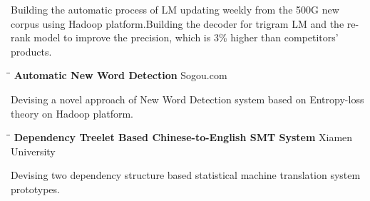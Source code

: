 \documentclass{res}
\begin{document}
\begin{resume}
   Building the automatic process of LM updating weekly from the 500G new corpus using Hadoop platform.Building the decoder for trigram LM and the re-rank model to improve the precision, which is 3\% higher than competitors' products.
   \vspace{-0.1in}	
   \begin{tabbing}
   \hspace{2.5in}\= \hspace{3in}\= \kill %
    {\bf Automatic New Word Detection}\> \>Sogou.com     \\
   \end{tabbing}\vspace{-30pt}      %
   Devising a novel approach of New Word Detection system based on Entropy-loss theory on Hadoop platform.\\
   \vspace{-0.2in}	
   \begin{tabbing}
   \hspace{2.5in}\= \hspace{3in}\= \kill %
    {\bf Dependency Treelet Based Chinese-to-English SMT System} \> \>Xiamen University\\
   \end{tabbing}\vspace{-30pt}      %
   Devising two dependency structure based statistical machine translation system prototypes. 



\end{resume}
\end{document}
